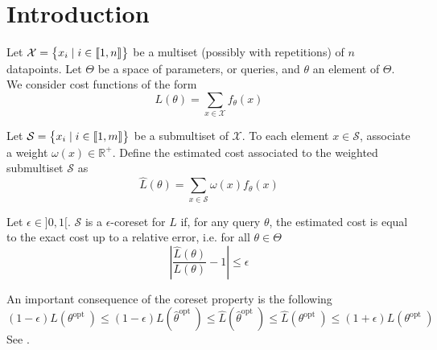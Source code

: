 \section{Introduction}
	
	Let $\mathcal{X}=\begin{Bmatrix}
		x_{i} \mid i\in \llbracket 1,n \rrbracket
	\end{Bmatrix}$ be a multiset (possibly with repetitions) of $n$ datapoints. Let $\Theta$ be a space of parameters, or queries, and $\theta$ an element of $\Theta$. We consider cost functions of the form
	$$
	L(\theta)=\sum_{x \in \mathcal{X}} f_\theta(x)
	$$
	
	Let $\mathcal{S}=\begin{Bmatrix}
		x_{i} \mid i\in \llbracket 1,m \rrbracket
	\end{Bmatrix}$ be a submultiset of $\mathcal{X}$. To each element $x \in \mathcal{S}$, associate a weight $\omega\left(x\right) \in \mathbb{R}^{+}$. Define the estimated cost associated to the weighted submultiset $\mathcal{S}$ as
	$$
	\hat{L}(\theta)=\sum_{x \in \mathcal{S}} \omega\left(x\right) f_\theta(x)
	$$
	\begin{definition}[Coreset]
			Let $\epsilon \in {]}0,1{[}$. $\mathcal{S}$ is a $\epsilon$-coreset for $L$ if, for any query $\theta$, the estimated cost is equal to the exact cost up to a relative error, i.e. for all $\theta \in \Theta$
		\begin{equation}
			\left|\frac{\hat{L}(\theta)}{L(\theta)}-1\right| \le \epsilon 
		\label{def_coresetprop}
		\end{equation}
	\end{definition}
An important consequence of the coreset property is the following
\begin{equation}
	(1-\epsilon) L(\theta^{\text {opt }}) \le(1-\epsilon) L( \hat{\theta}^{\text {opt }}) \le \hat{L}( \hat{\theta}^{\text {opt }}) \le \hat{L}( \theta^{\text {opt }}) \le(1+\epsilon) L( \theta^{\text {opt }})
\end{equation}
See \cite{bachem2017coresetML}.
